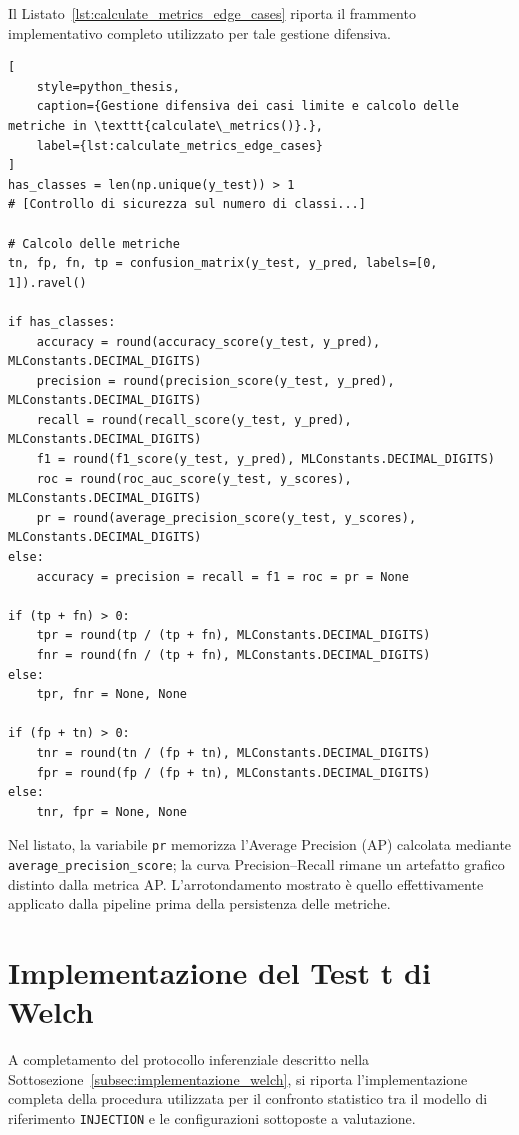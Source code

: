Il Listato~\ref{lst:calculate_metrics_edge_cases} riporta il frammento
implementativo completo utilizzato per tale gestione difensiva.

\newpage

\begin{lstlisting}[
    style=python_thesis,
    caption={Gestione difensiva dei casi limite e calcolo delle metriche in \texttt{calculate\_metrics()}.},
    label={lst:calculate_metrics_edge_cases}
]
has_classes = len(np.unique(y_test)) > 1
# [Controllo di sicurezza sul numero di classi...]

# Calcolo delle metriche
tn, fp, fn, tp = confusion_matrix(y_test, y_pred, labels=[0, 1]).ravel()

if has_classes:
    accuracy = round(accuracy_score(y_test, y_pred), MLConstants.DECIMAL_DIGITS)
    precision = round(precision_score(y_test, y_pred), MLConstants.DECIMAL_DIGITS)
    recall = round(recall_score(y_test, y_pred), MLConstants.DECIMAL_DIGITS)
    f1 = round(f1_score(y_test, y_pred), MLConstants.DECIMAL_DIGITS)
    roc = round(roc_auc_score(y_test, y_scores), MLConstants.DECIMAL_DIGITS)
    pr = round(average_precision_score(y_test, y_scores), MLConstants.DECIMAL_DIGITS)
else:
    accuracy = precision = recall = f1 = roc = pr = None
    
if (tp + fn) > 0:
    tpr = round(tp / (tp + fn), MLConstants.DECIMAL_DIGITS)
    fnr = round(fn / (tp + fn), MLConstants.DECIMAL_DIGITS)
else:
    tpr, fnr = None, None

if (fp + tn) > 0: 
    tnr = round(tn / (fp + tn), MLConstants.DECIMAL_DIGITS)
    fpr = round(fp / (fp + tn), MLConstants.DECIMAL_DIGITS)
else:
    tnr, fpr = None, None
\end{lstlisting}

Nel listato, la variabile \texttt{pr} memorizza l'Average Precision (AP) calcolata mediante \texttt{average\_\allowbreak{}precision\_\allowbreak{}score}; la curva Precision--Recall rimane un artefatto grafico distinto dalla metrica AP. L'arrotondamento mostrato è quello effettivamente applicato dalla pipeline prima della persistenza delle metriche.


\section{Implementazione del Test t di Welch}
\label{app:welch_implementation}

A completamento del protocollo inferenziale descritto nella Sottosezione~\ref{subsec:implementazione_welch}, si riporta l'implementazione completa della procedura utilizzata per il confronto statistico tra il modello di riferimento \texttt{INJECTION} e le configurazioni sottoposte a valutazione.

